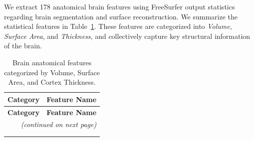 \documentclass[pdflatex,sn-nature]{sn-jnl}%
\theoremstyle{thmstyleone}%
\theoremstyle{thmstyletwo}%
\theoremstyle{thmstylethree}%
\begin{document}
\begin{appendices}
We extract 178 anatomical brain features using FreeSurfer output statistics regarding brain segmentation and surface reconstruction. We summarize the statistical features in Table~\ref{tab:anatomical_features}. These features are categorized into \textit{Volume}, \textit{Surface Area}, and \textit{Thickness}, and collectively capture key structural information of the brain.



\begin{small}
\begin{longtable}{l|l}



\toprule
\textbf{Category} & \textbf{Feature Name} \\
\midrule
\endfirsthead

\toprule
\textbf{Category} & \textbf{Feature Name} \\
\midrule
\endhead

\midrule
\multicolumn{2}{r}{\textit{(continued on next page)}} \\
\endfoot

\bottomrule
\caption{Brain anatomical features categorized by Volume, Surface Area, and Cortex Thickness.}
\label{tab:anatomical_features} \\
\endlastfoot



\end{longtable}
\end{small}
\end{appendices}
\end{document}
